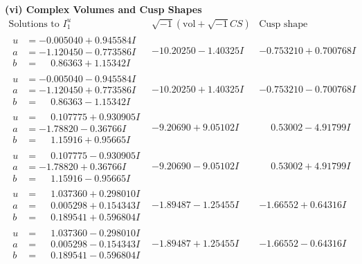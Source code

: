 \documentclass[1p]{elsarticle_modified}
\theoremstyle{definition}
\newcommand{\I}{\sqrt{-1}}
\begin{document}
\newpage\flushleft \textbf{(vi) Complex Volumes and Cusp Shapes}
$$\begin{array}{c|c|c}  
\text{Solutions to }I^u_{1}& \I (\text{vol} + \sqrt{-1}CS) & \text{Cusp shape}\\
 \hline 
\begin{aligned}
u &= -0.005040 + 0.945584 I \\
a &= -1.120450 - 0.773586 I \\
b &= \phantom{-}0.86363 + 1.15342 I\end{aligned}
 & -10.20250 - 1.40325 I & -0.753210 + 0.700768 I \\ \hline\begin{aligned}
u &= -0.005040 - 0.945584 I \\
a &= -1.120450 + 0.773586 I \\
b &= \phantom{-}0.86363 - 1.15342 I\end{aligned}
 & -10.20250 + 1.40325 I & -0.753210 - 0.700768 I \\ \hline\begin{aligned}
u &= \phantom{-}0.107775 + 0.930905 I \\
a &= -1.78820 - 0.36766 I \\
b &= \phantom{-}1.15916 + 0.95665 I\end{aligned}
 & -9.20690 + 9.05102 I & \phantom{-}0.53002 - 4.91799 I \\ \hline\begin{aligned}
u &= \phantom{-}0.107775 - 0.930905 I \\
a &= -1.78820 + 0.36766 I \\
b &= \phantom{-}1.15916 - 0.95665 I\end{aligned}
 & -9.20690 - 9.05102 I & \phantom{-}0.53002 + 4.91799 I \\ \hline\begin{aligned}
u &= \phantom{-}1.037360 + 0.298010 I \\
a &= \phantom{-}0.005298 + 0.154343 I \\
b &= \phantom{-}0.189541 + 0.596804 I\end{aligned}
 & -1.89487 - 1.25455 I & -1.66552 + 0.64316 I \\ \hline\begin{aligned}
u &= \phantom{-}1.037360 - 0.298010 I \\
a &= \phantom{-}0.005298 - 0.154343 I \\
b &= \phantom{-}0.189541 - 0.596804 I\end{aligned}
 & -1.89487 + 1.25455 I & -1.66552 - 0.64316 I \\ \hline\begin{aligned}

\end{aligned}
\end{array}$$
\end{document}
